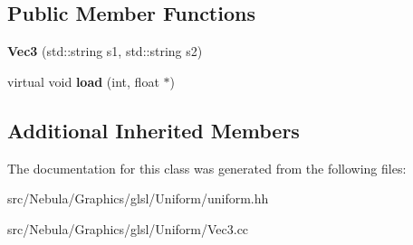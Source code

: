 \subsection*{Public Member Functions}
\begin{DoxyCompactItemize}
\item 
\hypertarget{classNeb_1_1glsl_1_1Uniform_1_1Vector_1_1Vec3_a1248082071bae8dbd4d346185c9b7185}{{\bfseries Vec3} (std\-::string s1, std\-::string s2)}\label{classNeb_1_1glsl_1_1Uniform_1_1Vector_1_1Vec3_a1248082071bae8dbd4d346185c9b7185}

\item 
\hypertarget{classNeb_1_1glsl_1_1Uniform_1_1Vector_1_1Vec3_ab6a541de14853990529d634b0971c28a}{virtual void {\bfseries load} (int, float $\ast$)}\label{classNeb_1_1glsl_1_1Uniform_1_1Vector_1_1Vec3_ab6a541de14853990529d634b0971c28a}

\end{DoxyCompactItemize}
\subsection*{Additional Inherited Members}


The documentation for this class was generated from the following files\-:\begin{DoxyCompactItemize}
\item 
src/\-Nebula/\-Graphics/glsl/\-Uniform/uniform.\-hh\item 
src/\-Nebula/\-Graphics/glsl/\-Uniform/Vec3.\-cc\end{DoxyCompactItemize}

